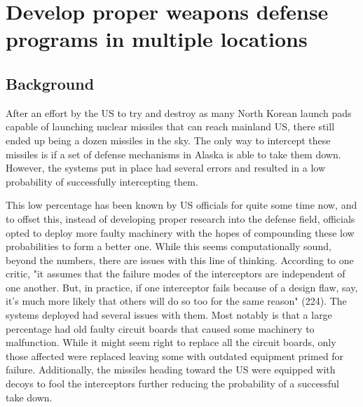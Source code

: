\documentclass[12pt]{turabian-researchpaper}
\begin{document}


\section{Develop proper weapons defense programs in multiple locations}

	\subsection{Background}

	After an effort by the US to try and destroy as many North Korean launch pads capable of launching nuclear missiles that can reach mainland US, there still ended up being a dozen missiles in the sky. The only way to intercept these missiles is if a set of defense mechanisms in Alaska is able to take them down. However, the systems put in place had several errors and resulted in a low probability of successfully intercepting them.

	This low percentage has been known by US officials for quite some time now, and to offset this, instead of developing proper research into the defense field, officials opted to deploy more faulty machinery with the hopes of compounding these low probabilities to form a better one. While this seems computationally sound, beyond the numbers, there are issues with this line of thinking. According to one critic, "it assumes that the failure modes of the interceptors are independent of one another. But, in practice, if one interceptor fails because of a design flaw, say, it's much more likely that others will do so too for the same reason" (224). The systems deployed had several issues with them. Most notably is that a large percentage had old faulty circuit boards that caused some machinery to malfunction. While it might seem right to replace all the circuit boards, only those affected were replaced leaving some with outdated equipment primed for failure. Additionally, the missiles heading toward the US were equipped with decoys to fool the interceptors further reducing the probability of a successful take down.
\end{document}
